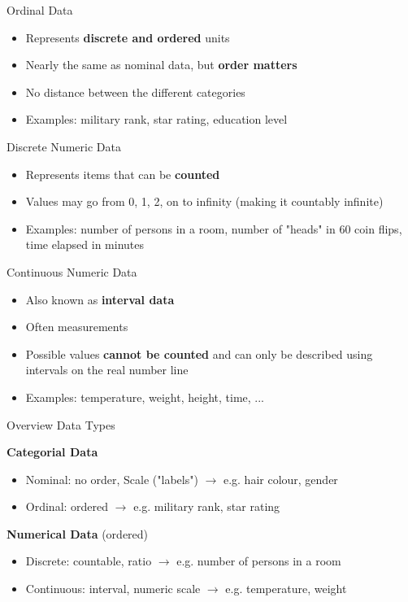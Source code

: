\begin{corollary}{Ordinal Data}
    \begin{itemize}
        \item Represents \textbf{discrete and ordered} units
        \item Nearly the same as nominal data, but \textbf{order matters}
        \item No distance between the different categories
        \item Examples: military rank, star rating, education level
    \end{itemize}
\end{corollary}

\begin{corollary}{Discrete Numeric Data}
    \begin{itemize}
        \item Represents items that can be \textbf{counted}
        \item Values may go from 0, 1, 2, on to infinity (making it countably infinite)
        \item Examples: number of persons in a room, number of "heads" in 60 coin flips, time elapsed in minutes
    \end{itemize}
\end{corollary}

\begin{corollary}{Continuous Numeric Data}
    \begin{itemize}
        \item Also known as \textbf{interval data}
        \item Often measurements
        \item Possible values \textbf{cannot be counted} and can only be described using intervals on the real number line
        \item Examples: temperature, weight, height, time, ...
    \end{itemize}
\end{corollary}

\begin{concept}{Overview Data Types}

    \textbf{Categorial Data}
    \begin{itemize}
        \item Nominal: no order, Scale ("labels") $\rightarrow$ e.g. hair colour, gender
        \item Ordinal: ordered $\rightarrow$ e.g. military rank, star rating
    \end{itemize}

    \textbf{Numerical Data} (ordered)
    \begin{itemize}
        \item Discrete: countable, ratio $\rightarrow$ e.g. number of persons in a room
        \item Continuous: interval, numeric scale $\rightarrow$ e.g. temperature, weight
    \end{itemize}
\end{concept}


